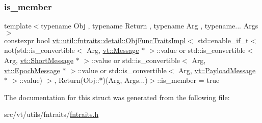 \subsubsection{\texorpdfstring{is\+\_\+member}{is\_member}}
{\footnotesize\ttfamily template$<$typename Obj , typename Return , typename Arg , typename... Args$>$ \\
constexpr bool \hyperlink{structvt_1_1util_1_1fntraits_1_1detail_1_1_obj_func_traits_impl}{vt\+::util\+::fntraits\+::detail\+::\+Obj\+Func\+Traits\+Impl}$<$ std\+::enable\+\_\+if\+\_\+t$<$ not(std\+::is\+\_\+convertible$<$ Arg, \hyperlink{namespacevt_a3a3ddfef40b4c90915fa43cdd5f129ea}{vt\+::\+Message} $\ast$ $>$\+::value or std\+::is\+\_\+convertible$<$ Arg, \hyperlink{namespacevt_a1125ac1da6c0bbf141e0ea0739d7602d}{vt\+::\+Short\+Message} $\ast$ $>$\+::value or std\+::is\+\_\+convertible$<$ Arg, \hyperlink{namespacevt_ad67368ffae52d7325002586b41bb150e}{vt\+::\+Epoch\+Message} $\ast$ $>$\+::value or std\+::is\+\_\+convertible$<$ Arg, \hyperlink{namespacevt_a89a92229c5622b855c02c549f83a1a68}{vt\+::\+Payload\+Message} $\ast$ $>$\+::value) $>$, Return(Obj\+::$\ast$)(Arg, Args...)$>$\+::is\+\_\+member = true\hspace{0.3cm}{\ttfamily [static]}}



The documentation for this struct was generated from the following file\+:\begin{DoxyCompactItemize}
\item 
src/vt/utils/fntraits/\hyperlink{fntraits_8h}{fntraits.\+h}\end{DoxyCompactItemize}
